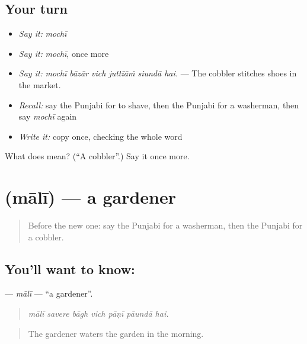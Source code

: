 \subsection*{Your turn}
\begin{itemize}
\raggedright
  \item \emph{Say it:} \emph{mochī}
  \item \emph{Say it:} \emph{mochī}, once more
  \item \emph{Say it:} \emph{mochī bāzār vich juttīāṁ siundā hai.} — The cobbler stitches shoes in the market.
  \item \emph{Recall:} say the Punjabi for to shave, then the Punjabi for a washerman, then say \emph{mochī} again
  \item \emph{Write it:} copy \textbf{} once, checking the whole word
\end{itemize}

\begin{tcolorbox}[breakable,colback=teal!4,colframe=teal!35!black,title={Before you move on}]
What does  mean? (\textquotedblleft{}A cobbler\textquotedblright{}.) Say it once more.
\end{tcolorbox}
\section[\texorpdfstring{\pa{ਮਾਲੀ} (mālī)}{ਮਾਲੀ (mālī)}]{ (mālī) — a gardener}

\label{lesson:PA-C333-mali}



\begin{quote}
Before the new one: say the Punjabi for a washerman, then the Punjabi for a cobbler.
\end{quote}

\subsection*{You'll want to know: }
\textbf{} — \emph{mālī} — \textquotedblleft{}a gardener\textquotedblright{}.

\begin{quote}
      
\end{quote}

\begin{quote}
\emph{mālī savere bāgh vich pāṇī pāundā hai.}
\end{quote}

\begin{quote}
The gardener waters the garden in the morning.
\end{quote}

